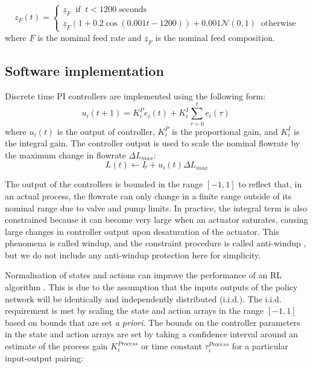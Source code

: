 \begin{equation}
	z_F(t) = 
	\begin{cases}
		\underline z_F \;\; \text{if}\;\; t < 1200 \;\text{seconds} \\
		\underline z_F(1+ 0.2\cos(0.001t-1200))+0.001 \mathcal{N}(0,1) \;\; \text{otherwise}
	\end{cases}
\end{equation}
where $\underline F$ is the nominal feed rate and $\underline z_F$ is the nominal feed composition.

\subsection{Software implementation}
Discrete time PI controllers are implemented using the following form:
	\begin{equation}
	u_i(t+1) = K_i^P e_i(t) +K_i^I \sum_{\tau=0}^{t}{e_i(\tau)}\ 
	\end{equation}
where $u_i(t)$ is the output of controller, $K_i^P$ is the proportional gain, and $K_i^I$ is the integral gain. The controller output is used to scale the nominal flowrate by the maximum change in flowrate $\Delta L_{max}$:
\begin{equation}
	L(t) \leftarrow \underline L + u_i(t)\Delta L_{max}
\end{equation}

The output of the controllers is bounded in the range $[-1,1]$ to reflect that, in an actual process, the flowrate can only change in a finite range outside of its nominal range due to valve and pump limits. In practice, the integral term is also constrained because it can become very large when an actuator saturates, causing large changes in controller output upon desaturation of the actuator. This phenomena is called windup, and the constraint procedure is called anti-windup \cite{Riggs2006}, but we do not include any anti-windup protection here for simplicity.

Normalisation of states and actions can improve the performance of an RL algorithm \cite{Engstrom2020}. This is due to the assumption that the inputs outputs of the policy network will be identically and independently distributed (i.i.d.).  The i.i.d. requirement is met by scaling the state and action arrays in the range $[-1,1]$ based on bounds that are set \emph{a priori}. The bounds on the controller parameters in the state and action arrays are set by taking a confidence interval around an estimate of the process gain $K_i^{Process}$ or time constant $\tau_i^{Process}$ for a particular input-output pairing\cite{Cai2009, Astrom2006}:


